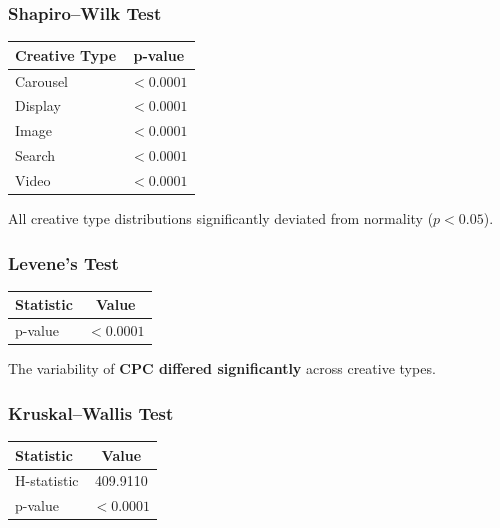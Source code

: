 \subsubsection{Shapiro--Wilk Test}

\begin{table}[H]
	\centering
	\begin{tabular}{lc}
		\toprule
		Creative Type & p-value \\
		\midrule
		Carousel & $<0.0001$ \\
		Display & $<0.0001$ \\
		Image & $<0.0001$ \\
		Search & $<0.0001$ \\
		Video & $<0.0001$ \\
		\bottomrule
	\end{tabular}
\end{table}

All creative type distributions significantly deviated from normality ($p<0.05$).

\vspace{0.3cm}

\subsubsection{Levene's Test}

\begin{table}[H]
	\centering
	\begin{tabular}{lc}
		\toprule
		Statistic & Value \\
		\midrule
		p-value & $<0.0001$ \\
		\bottomrule
	\end{tabular}
\end{table}

The variability of \textbf{CPC differed significantly} across creative types.

\vspace{0.3cm}

\subsubsection{Kruskal--Wallis Test}

\begin{table}[H]
	\centering
	\begin{tabular}{lc}
		\toprule
		Statistic & Value \\
		\midrule
		H-statistic & 409.9110 \\
		p-value & $<0.0001$ \\
		\bottomrule
	\end{tabular}
\end{table}


